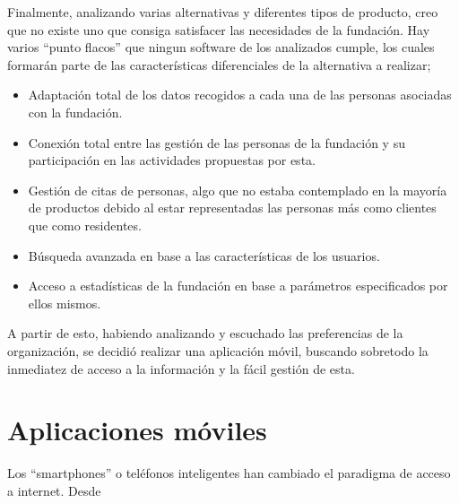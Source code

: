 Finalmente, analizando varias alternativas y diferentes tipos de producto, creo que no existe uno que consiga satisfacer las necesidades de la fundación. Hay varios ``punto flacos'' que ningun software de los analizados cumple, los cuales formarán parte de las características diferenciales de la alternativa a realizar;

\begin{itemize}
    \item Adaptación total de los datos recogidos a cada una de las personas asociadas con la fundación.
    \item Conexión total entre las gestión de las personas de la fundación y su participación en las actividades propuestas por esta.
    \item Gestión de citas de personas, algo que no estaba contemplado en la mayoría de productos debido al estar representadas las personas más como clientes que como residentes.
    \item Búsqueda avanzada en base a las características de los usuarios.
    \item Acceso a estadísticas de la fundación en base a parámetros especificados por ellos mismos.
\end{itemize}

A partir de esto, habiendo analizando y escuchado las preferencias de la organización, se decidió realizar una aplicación móvil, buscando sobretodo la inmediatez de acceso a la información y la fácil gestión de esta.     

\section{Aplicaciones móviles}

Los ``smartphones'' o teléfonos inteligentes han cambiado el paradigma de acceso a internet. Desde 